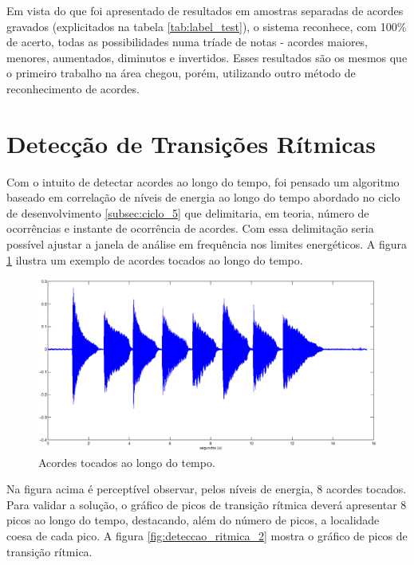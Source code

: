 \newpage
Em vista do que foi apresentado de resultados em amostras separadas de acordes gravados (explicitados na tabela \ref{tab:label_test}), o sistema reconhece, com 100\% de acerto, todas as possibilidades numa tríade de notas - acordes maiores, menores, aumentados, diminutos e invertidos. Esses resultados são os mesmos que o primeiro trabalho na área \cite{fujishima1999realtime} chegou, porém, utilizando outro método de reconhecimento de acordes.

\section{Detecção de Transições Rítmicas}

Com o intuito de detectar acordes ao longo do tempo, foi pensado um algoritmo baseado em correlação de níveis de energia ao longo do tempo abordado no ciclo de desenvolvimento \ref{subsec:ciclo_5} que delimitaria, em teoria, número de ocorrências e instante de ocorrência de acordes. Com essa delimitação seria possível ajustar a janela de análise em frequência nos limites energéticos. A figura \ref{fig:deteccao_ritmica_1} ilustra um exemplo de acordes tocados ao longo do tempo. 

\begin{figure}[h]
    \centering
    \includegraphics[keepaspectratio=true,scale=0.45]{figuras/deteccao_ritmica_1.eps}
  \caption{Acordes tocados ao longo do tempo.}
  \label{fig:deteccao_ritmica_1}
\end{figure}

Na figura acima é perceptível observar, pelos níveis de energia, 8 acordes tocados. Para validar a solução, o gráfico de picos de transição rítmica deverá apresentar 8 picos ao longo do tempo, destacando, além do número de picos, a localidade coesa de cada pico. A figura \ref{fig:deteccao_ritmica_2} mostra o gráfico de picos de transição rítmica.


